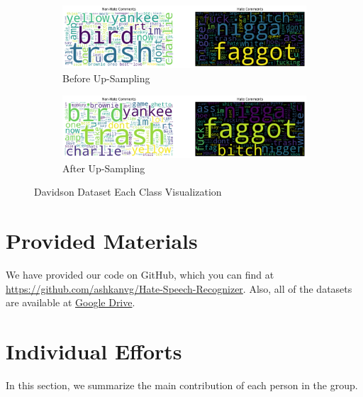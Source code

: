 \documentclass[11pt]{article}
\begin{document}
\begin{figure}[h]
    \centering
    \begin{subfigure}[b]{0.45\textwidth}
        \centering
        \includegraphics[width=\textwidth]{images/hatespeech_visualization/davidson(1)-before.png}
        \caption{Before Up-Sampling}
        \label{fig:before-davidson}
    \end{subfigure}
    \hfill
    \begin{subfigure}[b]{0.45\textwidth}
        \centering
        \includegraphics[width=\textwidth]{images/hatespeech_visualization/davidson(2)-after.png}
        \caption{After Up-Sampling}
        \label{fig:after-davidson}
    \end{subfigure}
    
    \caption{Davidson Dataset Each Class Visualization}
    \label{fig:data-visualization-davidson}
\end{figure}

\section{Provided Materials}
\label{sec:materials}
We have provided our code on GitHub, which you can find at \href{https://github.com/ashkanvg/Hate-Speech-Recognizer}{https://github.com/ashkanvg/Hate-Speech-Recognizer}. Also, all of the datasets are available at \href{https://drive.google.com/drive/folders/1yrHJnPINYEEe674dYridJc23odxYG5h6?usp=sharing}{Google Drive}.


\section{Individual Efforts}
In this section, we summarize the main contribution of each person in the group. 
\end{document}
